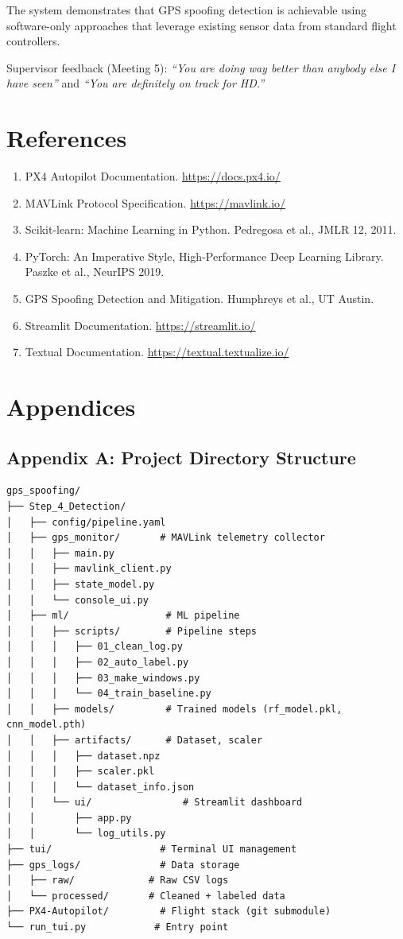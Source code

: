 \documentclass[12pt,a4paper]{article}
\begin{document}
The system demonstrates that GPS spoofing detection is achievable using software-only approaches that leverage existing sensor data from standard flight controllers.

Supervisor feedback (Meeting 5): \textit{``You are doing way better than anybody else I have seen''} and \textit{``You are definitely on track for HD.''}

\newpage

\section{References}

\begin{enumerate}
    \item PX4 Autopilot Documentation. \url{https://docs.px4.io/}
    \item MAVLink Protocol Specification. \url{https://mavlink.io/}
    \item Scikit-learn: Machine Learning in Python. Pedregosa et al., JMLR 12, 2011.
    \item PyTorch: An Imperative Style, High-Performance Deep Learning Library. Paszke et al., NeurIPS 2019.
    \item GPS Spoofing Detection and Mitigation. Humphreys et al., UT Austin.
    \item Streamlit Documentation. \url{https://streamlit.io/}
    \item Textual Documentation. \url{https://textual.textualize.io/}
\end{enumerate}

\newpage

\section{Appendices}

\subsection{Appendix A: Project Directory Structure}

\begin{verbatim}
gps_spoofing/
├── Step_4_Detection/
│   ├── config/pipeline.yaml
│   ├── gps_monitor/       # MAVLink telemetry collector
│   │   ├── main.py
│   │   ├── mavlink_client.py
│   │   ├── state_model.py
│   │   └── console_ui.py
│   ├── ml/                 # ML pipeline
│   │   ├── scripts/        # Pipeline steps
│   │   │   ├── 01_clean_log.py
│   │   │   ├── 02_auto_label.py
│   │   │   ├── 03_make_windows.py
│   │   │   └── 04_train_baseline.py
│   │   ├── models/         # Trained models (rf_model.pkl, cnn_model.pth)
│   │   ├── artifacts/      # Dataset, scaler
│   │   │   ├── dataset.npz
│   │   │   ├── scaler.pkl
│   │   │   └── dataset_info.json
│   │   └── ui/                # Streamlit dashboard
│   │       ├── app.py
│   │       └── log_utils.py
├── tui/                   # Terminal UI management
├── gps_logs/              # Data storage
│   ├── raw/             # Raw CSV logs
│   └── processed/       # Cleaned + labeled data
├── PX4-Autopilot/         # Flight stack (git submodule)
└── run_tui.py            # Entry point
\end{verbatim}
\end{document}
